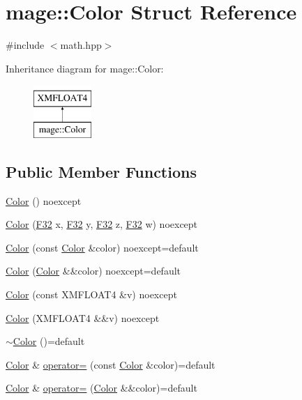 \hypertarget{structmage_1_1_color}{}\section{mage\+:\+:Color Struct Reference}
\label{structmage_1_1_color}


{\ttfamily \#include $<$math.\+hpp$>$}

Inheritance diagram for mage\+:\+:Color\+:\begin{figure}[H]
\begin{center}
\leavevmode
\includegraphics[height=2.000000cm]{structmage_1_1_color}
\end{center}
\end{figure}
\subsection*{Public Member Functions}
\begin{DoxyCompactItemize}
\item 
\hyperlink{structmage_1_1_color_a542f26c61d9c67098302b0262c518758}{Color} () noexcept
\item 
\hyperlink{structmage_1_1_color_a9f13bfcd7da083cd49ebcf4d24397e83}{Color} (\hyperlink{namespacemage_aa97e833b45f06d60a0a9c4fc22ae02c0}{F32} x, \hyperlink{namespacemage_aa97e833b45f06d60a0a9c4fc22ae02c0}{F32} y, \hyperlink{namespacemage_aa97e833b45f06d60a0a9c4fc22ae02c0}{F32} z, \hyperlink{namespacemage_aa97e833b45f06d60a0a9c4fc22ae02c0}{F32} w) noexcept
\item 
\hyperlink{structmage_1_1_color_a89c7093e06f3554839a4016f287ef3d8}{Color} (const \hyperlink{structmage_1_1_color}{Color} \&color) noexcept=default
\item 
\hyperlink{structmage_1_1_color_ada141b94913980bf54a3ac4fb3d45f35}{Color} (\hyperlink{structmage_1_1_color}{Color} \&\&color) noexcept=default
\item 
\hyperlink{structmage_1_1_color_afb821e8ce617a6475538fa7179a16c6b}{Color} (const X\+M\+F\+L\+O\+A\+T4 \&v) noexcept
\item 
\hyperlink{structmage_1_1_color_a6e01540c01b2923974ca31e1621f1f7e}{Color} (X\+M\+F\+L\+O\+A\+T4 \&\&v) noexcept
\item 
\hyperlink{structmage_1_1_color_aa4df1c9718b7846adf77fbeed79ac219}{$\sim$\+Color} ()=default
\item 
\hyperlink{structmage_1_1_color}{Color} \& \hyperlink{structmage_1_1_color_a194847cf864911d7ceff16aabec1459f}{operator=} (const \hyperlink{structmage_1_1_color}{Color} \&color)=default
\item 
\hyperlink{structmage_1_1_color}{Color} \& \hyperlink{structmage_1_1_color_aa16160a9b8a03a8b2d82569343dd8c6d}{operator=} (\hyperlink{structmage_1_1_color}{Color} \&\&color)=default
\end{DoxyCompactItemize}



